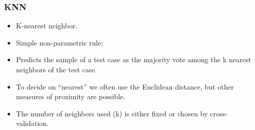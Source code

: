 \begin{frame}
\frametitle{KNN}
\begin{itemize}

\item K-nearest neighbor.

\item Simple non-parametric rule:

\item Predicts the sample of a test case as the majority vote
among the k nearest neighbors of the test case.

\item To decide on ``nearest'' we often use
the Euclidean distance, but other measures of proximity are possible. 

\item The number of neighbors used (k) is either fixed or chosen
by cross-validation.
\end{itemize}

\end{frame}





